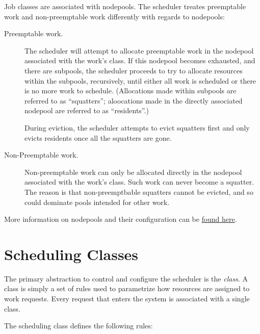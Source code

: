     Job classes are associated with nodepools.  The scheduler treates preemptable work and
    non-preemptable work differently with regards to nodepools:
    \begin{description}
      \item[Preemptable work.] The scheduler will attempt to allocate preemptable work in
        the nodepool associated with the work's class.  If this nodepool becomes exhausted,
        and there are subpools, the scheduler proceeds to try to allocate resources within
        the subpools, recursively, until either all work is scheduled or there is no more
        work to schedule.  (Allocations made within subpools are referred to as ``squatters'';
        aloocations made in the directly associated nodepool are referred to as ``residents''.)

        During eviction, the scheduler attempts to evict squatters first and only evicts
        residents once all the squatters are gone.
        
      \item[Non-Preemptable work.]  Non-preemptable work can only be allocated directly
        in the nodepool associated with the work's class.  Such work can never become a
        squatter.  The reason is that non-preemptbable squatters cannot be evicted, and so
        could dominate pools intended for other work.
     \end{description}    
    
    More information on nodepools and their configuration can be \hyperref[subsec:nodepools]{found here}.

    \section{Scheduling Classes}
    \label{sec:rm.job-classes}
    The primary abstraction to control and configure the scheduler is the {\em class}. A class is simply a set 
    of rules used to parametrize how resources are assigned to work requests. Every request that enters the system is 
    associated with a single class. 
    
    The scheduling class defines the following rules: 
    
